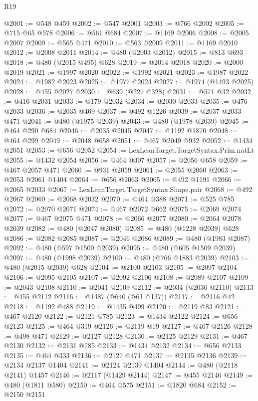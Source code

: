 \begin{lexlean}{R19}
\begin{coremodule}
@2001 := @548 @459
@2002 := @547 @2001
@2003 := @766 @2002
@2005 := @715 @65 @578
@2006 := @561 @684
@2007 := @1169 @2006
@2008 := @2005 @2007
@2009 := @565 @471
@2010 := @563 @2009
@2011 := @1169 @2010
@2012 := @2008 @2011
@2014 := @480 (@2003 @2012)
@2015 := @813 @693
@2018 := @480 (@2015 @495) @628
@2019 := @2014 @2018
@2020 := @2000 @2019
@2021 := @1997 @2020
@2022 := @1992 @2021
@2023 := @1987 @2022
@2024 := @1982 @2023
@2025 := @1977 @2024
@2027 := @1974 (@1493 @2025)
@2028 := @455 @2027
@2030 := @639 (@227 @328)
@2031 := @571 @32
@2032 := @416 @2031
@2033 := @179 @2032
@2034 := @2030 @2033
@2035 := @476 @2033
@2036 := @2035 @469
@2037 := @492 @1226
@2039 := @2037 @2033 @471
@2041 := @480 (@1975 @2039)
@2043 := @480 (@1978 @2039)
@2045 := @464 @290 @684
@2046 := @2035 @2045
@2047 := @1192 @1870
@2048 := @464 @299
@2049 := @2048 @658
@2051 := @467 @2049 @932
@2052 := @1434 @2051
@2053 := @656 @2052
@2054 := LexLeanTarget.TargetSyntax.Prim.natLt
@2055 := @1432 @2054
@2056 := @464 @307
@2057 := @2056 @658
@2059 := @467 @2057 @471
@2060 := @931 @2059
@2061 := @2055 @2060
@2063 := @2053 @2061 @1404
@2064 := @656 @2063
@2065 := @492 @1191
@2066 := @2065 @2033
@2067 := LexLeanTarget.TargetSyntax.Shape.pair
@2068 := @492 @2067
@2069 := @2068 @2032
@2070 := @464 @388
@2071 := @525 @785
@2072 := @2070 @2071
@2074 := @467 @2072 @662
@2075 := @2069 @2074
@2077 := @467 @2075 @471
@2078 := @2066 @2077
@2080 := @2064 @2078 @2039
@2082 := @480 (@2047 @2080)
@2085 := @480 (@1228 @2039) @628
@2086 := @2082 @2085
@2087 := @2046 @2086
@2089 := @480 (@1983 @2087)
@2092 := @480 (@597 @1500 @2039)
@2095 := @480 (@605 @1509 @2039)
@2097 := @480 (@1998 @2039)
@2100 := @480 (@766 @1883 @2039)
@2103 := @480 (@2015 @2039) @628
@2104 := @2100 @2103
@2105 := @2097 @2104
@2106 := @2095 @2105
@2107 := @2092 @2106
@2108 := @2089 @2107
@2109 := @2043 @2108
@2110 := @2041 @2109
@2112 := @2034 (@2036 @2110)
@2113 := @455 @2112
@2116 := @1487 (@640 (@61 @137))
@2117 := @2116 @42
@2118 := @1192 @488
@2119 := @1435 @499
@2120 := @2119 @83
@2121 := @467 @2120
@2122 := @2121 @785
@2123 := @1434 @2122
@2124 := @656 @2123
@2125 := @464 @319
@2126 := @2119 @19
@2127 := @467 @2126
@2128 := @498 @471
@2129 := @2127 @2128
@2130 := @2125 @2129
@2131 := @467 @2130
@2132 := @2131 @785
@2133 := @1434 @2132
@2134 := @656 @2133
@2135 := @464 @333
@2136 := @2127 @471
@2137 := @2135 @2136
@2139 := @2134 @2137 @1404
@2141 := @2124 @2139 @1404
@2144 := @480 (@2118 @2141) @1457
@2146 := @2117 (@1429 @2144)
@2147 := @455 @2146
@2149 := @480 (@1811 @580)
@2150 := @464 @575
@2151 := @1820 @684
@2152 := @2150 @2151

\end{coremodule}
\end{lexlean}
